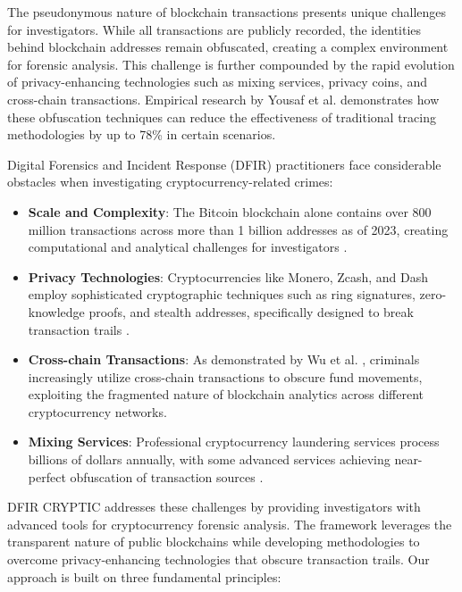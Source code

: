 \documentclass[conference]{IEEEtran}
\begin{document}
The pseudonymous nature of blockchain transactions presents unique challenges for investigators. While all transactions are publicly recorded, the identities behind blockchain addresses remain obfuscated, creating a complex environment for forensic analysis. This challenge is further compounded by the rapid evolution of privacy-enhancing technologies such as mixing services, privacy coins, and cross-chain transactions. Empirical research by Yousaf et al. \cite{yousaf2019} demonstrates how these obfuscation techniques can reduce the effectiveness of traditional tracing methodologies by up to 78\% in certain scenarios.

Digital Forensics and Incident Response (DFIR) practitioners face considerable obstacles when investigating cryptocurrency-related crimes:

\begin{itemize}
    \item \textbf{Scale and Complexity}: The Bitcoin blockchain alone contains over 800 million transactions across more than 1 billion addresses as of 2023, creating computational and analytical challenges for investigators \cite{ron2013}.
    
    \item \textbf{Privacy Technologies}: Cryptocurrencies like Monero, Zcash, and Dash employ sophisticated cryptographic techniques such as ring signatures, zero-knowledge proofs, and stealth addresses, specifically designed to break transaction trails \cite{biryukov2019}.
    
    \item \textbf{Cross-chain Transactions}: As demonstrated by Wu et al. \cite{wu2021}, criminals increasingly utilize cross-chain transactions to obscure fund movements, exploiting the fragmented nature of blockchain analytics across different cryptocurrency networks.
    
    \item \textbf{Mixing Services}: Professional cryptocurrency laundering services process billions of dollars annually, with some advanced services achieving near-perfect obfuscation of transaction sources \cite{balthasar2017}.
\end{itemize}

DFIR CRYPTIC addresses these challenges by providing investigators with advanced tools for cryptocurrency forensic analysis. The framework leverages the transparent nature of public blockchains while developing methodologies to overcome privacy-enhancing technologies that obscure transaction trails. Our approach is built on three fundamental principles:
\end{document}

